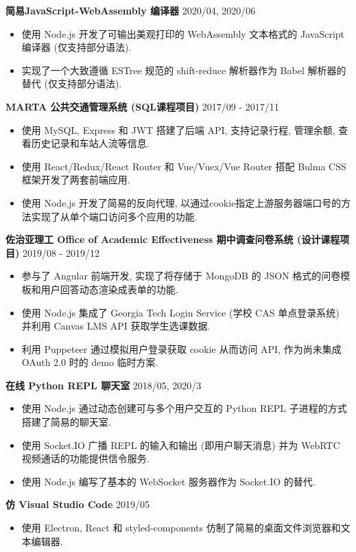 \documentclass[10.5pt]{article}
\begin{document}
\textbf{简易JavaScript-WebAssembly 编译器} \hfill 2020/04, 2020/06
\begin{itemize}
\item 使用 Node.js 开发了可输出美观打印的 WebAssembly 文本格式的 JavaScript 编译器 (仅支持部分语法).
\item 实现了一个大致遵循 ESTree 规范的 shift-reduce 解析器作为 Babel 解析器的替代 (仅支持部分语法).
\end{itemize}

\textbf{MARTA 公共交通管理系统 (SQL课程项目) } \hfill 2017/09 - 2017/11
\begin{itemize}
\item 使用 MySQL, Express 和 JWT 搭建了后端 API, 支持记录行程, 管理余额, 查看历史记录和车站人流等信息.
\item 使用 React/Redux/React Router 和 Vue/Vuex/Vue Router 搭配 Bulma CSS 框架开发了两套前端应用.
\item 使用 Node.js 开发了简易的反向代理, 以通过cookie指定上游服务器端口号的方法实现了从单个端口访问多个应用的功能.
\end{itemize}

\textbf{佐治亚理工 Office of Academic Effectiveness 期中调查问卷系统 (设计课程项目)}  \hfill 2019/08 - 2019/12
\begin{itemize}
\item 参与了 Angular 前端开发, 实现了将存储于 MongoDB 的 JSON 格式的问卷模板和用户回答动态渲染成表单的功能.
\item 使用 Node.js 集成了 Georgia Tech Login Service (学校 CAS 单点登录系统) 并利用 Canvas LMS API 获取学生选课数据.
\item 利用 Puppeteer 通过模拟用户登录获取 cookie 从而访问 API, 作为尚未集成 OAuth 2.0 时的 demo 临时方案.
\end{itemize}

\textbf{在线 Python REPL 聊天室}  \hfill 2018/05, 2020/3
\begin{itemize}
\item 使用 Node.js 通过动态创建可与多个用户交互的 Python REPL 子进程的方式搭建了简易的聊天室.
\item 使用 Socket.IO 广播 REPL 的输入和输出 (即用户聊天消息) 并为 WebRTC 视频通话的功能提供信令服务.
\item 使用 Node.js 编写了基本的 WebSocket 服务器作为 Socket.IO 的替代.
\end{itemize}

\textbf{仿 Visual Studio Code}  \hfill 2019/05
\begin{itemize}
\item 使用 Electron, React 和 styled-components 仿制了简易的桌面文件浏览器和文本编辑器. 
\end{itemize}
\end{document}
